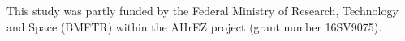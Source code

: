 \documentclass[runningheads]{llncs}
\begin{document}
\begin{credits}
\subsubsection{\ackname} This study was partly funded by the Federal Ministry of Research, Technology and Space (BMFTR) within the AHrEZ project (grant number 16SV9075).

\end{credits}





\end{document}
